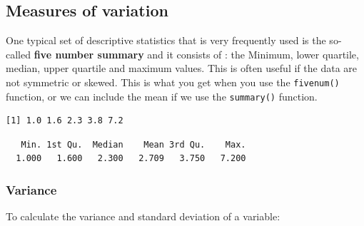 \documentclass[
  letterpaper,
  DIV=11,
  numbers=noendperiod]{scrreprt}
\newenvironment{Shaded}{\begin{snugshade}}{\end{snugshade}}
\newcommand{\AttributeTok}[1]{\textcolor[rgb]{0.40,0.45,0.13}{#1}}
\newcommand{\CommentTok}[1]{\textcolor[rgb]{0.37,0.37,0.37}{#1}}
\newcommand{\ConstantTok}[1]{\textcolor[rgb]{0.56,0.35,0.01}{#1}}
\newcommand{\FunctionTok}[1]{\textcolor[rgb]{0.28,0.35,0.67}{#1}}
\newcommand{\NormalTok}[1]{\textcolor[rgb]{0.00,0.23,0.31}{#1}}
\newcommand{\SpecialCharTok}[1]{\textcolor[rgb]{0.37,0.37,0.37}{#1}}
\begin{document}
\hypertarget{measures-of-variation}{%
\subsection{Measures of variation}\label{measures-of-variation}}

One typical set of descriptive statistics that is very frequently used
is the so-called \textbf{five number summary} and it consists of : the
Minimum, lower quartile, median, upper quartile and maximum values. This
is often useful if the data are not symmetric or skewed. This is what
you get when you use the \texttt{fivenum()} function, or we can include
the mean if we use the \texttt{summary()} function.

\begin{Shaded}
\end{Shaded}

\begin{verbatim}
[1] 1.0 1.6 2.3 3.8 7.2
\end{verbatim}

\begin{Shaded}
\end{Shaded}

\begin{verbatim}
   Min. 1st Qu.  Median    Mean 3rd Qu.    Max. 
  1.000   1.600   2.300   2.709   3.750   7.200 
\end{verbatim}

\hypertarget{variance}{%
\subsubsection{Variance}\label{variance}}

To calculate the variance and standard deviation of a variable:

\begin{Shaded}
\end{Shaded}
\end{document}
